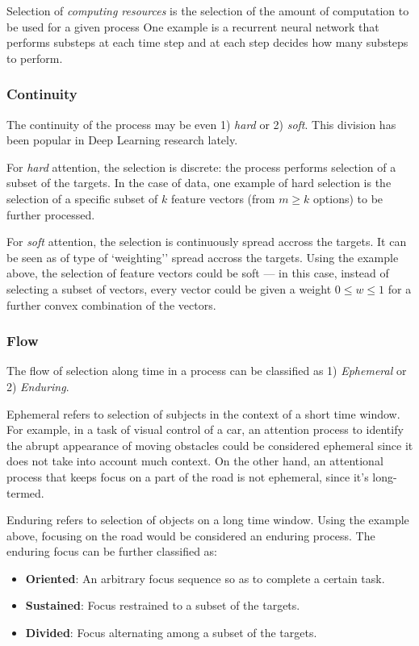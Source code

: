 \documentclass[11pt]{article}
\begin{document}
Selection of \emph{computing resources} is the selection of the amount
of computation to be used for a given process
One example is a recurrent neural network that performs substeps at
each time step and at each step decides how many substeps to perform.

\subsubsection{Continuity}
The continuity of the process may be even 1) \emph{hard} or 2) \emph{soft}.
This division has been popular in Deep Learning research lately.

For \emph{hard} attention, the selection is discrete:
the process performs selection of a subset of the targets.
In the case of data, one example of hard selection is the
selection of a specific subset of $k$ feature vectors (from $m \ge k$ options)
to be further processed.

For \emph{soft} attention, the selection is continuously spread accross the
targets. It can be seen as of type of `weighting'' spread accross the targets.
Using the example above, the selection of feature vectors could be soft ---
in this case, instead of selecting a subset of vectors, every vector
could be given a weight $0 \le w \le 1$ for a further convex combination
of the vectors.

\subsubsection{Flow}
The flow of selection along time in a process
can be classified as 1) \emph{Ephemeral} or 2) \emph{Enduring}.

Ephemeral refers to selection of subjects in the context of a short time window.
For example, in a task of visual control of a car,
an attention process to identify the abrupt appearance of moving obstacles
could be considered ephemeral since it does not take into account
much context.
On the other hand, an attentional process that keeps focus on
a part of the road is not ephemeral, since it's long-termed.

Enduring refers to selection of objects on a long time window.
Using the example above, focusing on the road would be considered
an enduring process.
The enduring focus can be further classified as:
\begin{itemize}
    \item \textbf{Oriented}: An arbitrary focus sequence so as to complete a certain task.
    \item \textbf{Sustained}: Focus restrained to a subset of the targets.
    \item \textbf{Divided}: Focus alternating among a subset of the targets.
\end{itemize}
\end{document}
